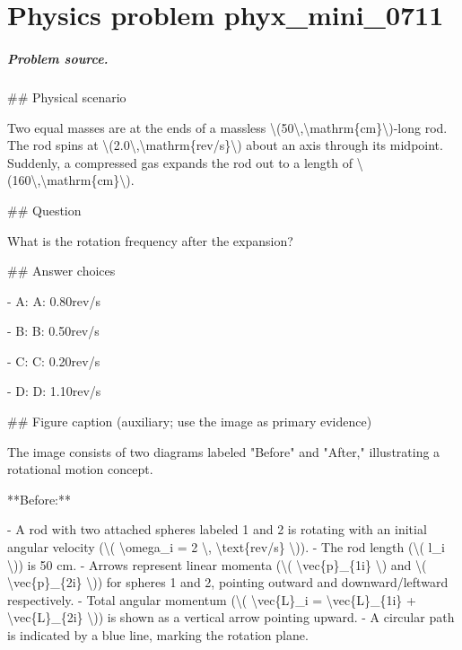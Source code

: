 
\chapter{Physics problem phyx\_mini\_0711}
\label{ch:PhyXMiniProblems_problem_phyx_mini_0711}

\paragraph{Problem source.}
\#\# Physical scenario

Two equal masses are at the ends of a massless \textbackslash{}(50\textbackslash{},\textbackslash{}mathrm\{cm\}\textbackslash{})-long rod. The rod spins at \textbackslash{}(2.0\textbackslash{},\textbackslash{}mathrm\{rev/s\}\textbackslash{}) about an axis through its midpoint. Suddenly, a compressed gas expands the rod out to a length of \textbackslash{}(160\textbackslash{},\textbackslash{}mathrm\{cm\}\textbackslash{}).

\#\# Question

What is the rotation frequency after the expansion?

\#\# Answer choices

- A: A: 0.80rev/s

- B: B: 0.50rev/s

- C: C: 0.20rev/s

- D: D: 1.10rev/s

\#\# Figure caption (auxiliary; use the image as primary evidence)

The image consists of two diagrams labeled "Before" and "After," illustrating a rotational motion concept.

**Before:**

- A rod with two attached spheres labeled 1 and 2 is rotating with an initial angular velocity (\textbackslash{}( \textbackslash{}omega\_i = 2 \textbackslash{}, \textbackslash{}text\{rev/s\} \textbackslash{})).
- The rod length (\textbackslash{}( l\_i \textbackslash{})) is 50 cm.
- Arrows represent linear momenta (\textbackslash{}( \textbackslash{}vec\{p\}\_\{1i\} \textbackslash{}) and \textbackslash{}( \textbackslash{}vec\{p\}\_\{2i\} \textbackslash{})) for spheres 1 and 2, pointing outward and downward/leftward respectively.
- Total angular momentum (\textbackslash{}( \textbackslash{}vec\{L\}\_i = \textbackslash{}vec\{L\}\_\{1i\} + \textbackslash{}vec\{L\}\_\{2i\} \textbackslash{})) is shown as a vertical arrow pointing upward.
- A circular path is indicated by a blue line, marking the rotation plane.

